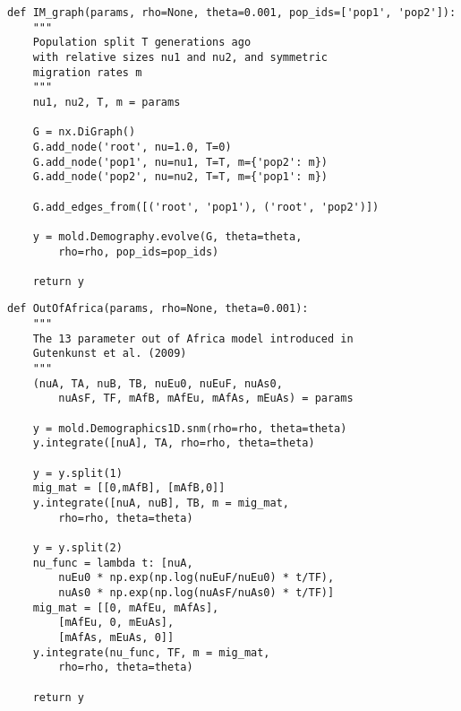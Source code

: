 \documentclass[10pt]{article}
\begin{document}
\begin{lstlisting}[caption={\textbf{IM model using Demography:} The same isolation with migration model, defined using the graphical representation of the Demography method.}, float, label={lst:IM_demo}]
def IM_graph(params, rho=None, theta=0.001, pop_ids=['pop1', 'pop2']):
    """
    Population split T generations ago
    with relative sizes nu1 and nu2, and symmetric
    migration rates m
    """
    nu1, nu2, T, m = params
    
    G = nx.DiGraph()
    G.add_node('root', nu=1.0, T=0)
    G.add_node('pop1', nu=nu1, T=T, m={'pop2': m})
    G.add_node('pop2', nu=nu2, T=T, m={'pop1': m})

    G.add_edges_from([('root', 'pop1'), ('root', 'pop2')])
    
    y = mold.Demography.evolve(G, theta=theta, 
        rho=rho, pop_ids=pop_ids)
    
    return y
\end{lstlisting}


\begin{lstlisting}[caption={\textbf{Out of Africa model:} The \citet{Gutenkunst2009} Out-of-Africa model, with 13 parameters as originally defined. This model has three representative continental populations (often YRI, CEU, and CHB), with an out of Africa split between Eurasian and African populations, followed by a split between European and East Asian populations, with symmetric migration rates and size changes along each branch.}, float, label={lst:ooa}]
def OutOfAfrica(params, rho=None, theta=0.001):
    """
    The 13 parameter out of Africa model introduced in
    Gutenkunst et al. (2009)
    """
    (nuA, TA, nuB, TB, nuEu0, nuEuF, nuAs0, 
        nuAsF, TF, mAfB, mAfEu, mAfAs, mEuAs) = params
    
    y = mold.Demographics1D.snm(rho=rho, theta=theta)
    y.integrate([nuA], TA, rho=rho, theta=theta)
    
    y = y.split(1)
    mig_mat = [[0,mAfB], [mAfB,0]]
    y.integrate([nuA, nuB], TB, m = mig_mat,
        rho=rho, theta=theta)
        
    y = y.split(2)
    nu_func = lambda t: [nuA,
        nuEu0 * np.exp(np.log(nuEuF/nuEu0) * t/TF),
        nuAs0 * np.exp(np.log(nuAsF/nuAs0) * t/TF)]
    mig_mat = [[0, mAfEu, mAfAs],
        [mAfEu, 0, mEuAs],
        [mAfAs, mEuAs, 0]]
    y.integrate(nu_func, TF, m = mig_mat, 
        rho=rho, theta=theta)
        
    return y
\end{lstlisting}
\end{document}
